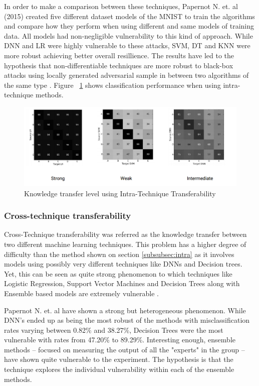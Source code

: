 In order to make a comparison between these techniques, Papernot N. et. al (2015) \cite{papernot2016transf} created five different dataset models of the MNIST to train the algorithms and compare how they perform when using different and same models of training data. All models had non-negligible vulnerability to this kind of approach. While DNN and LR were highly vulnerable to these attacks, SVM, DT and KNN were more robust achieving better overall resillience. The results have led to the hypothesis that non-differentiable techniques are more robust to black-box attacks using locally generated adversarial sample in between two algorithms of the same type \cite{papernot2016}. Figure ~\ref{fig:intra} shows classification performance when using intra-technique methods.

\begin{figure}[!h]
\centering
	\includegraphics[scale=0.6]{intra.png}
\caption{Knowledge transfer level using Intra-Technique Transferability \cite{papernot2016transf}}
\label{fig:intra}
\end{figure}


\subsubsection{Cross-technique transferability}
Cross-Technique transferability was referred as the knowledge transfer between two different machine learning techniques. This problem has a higher degree of difficulty than the method shown on section \ref{subsubsec:intra} as it involves models using possibly very different techniques like DNNs and Decision trees. Yet, this can be seen as quite strong phenomenon to which techniques like Logistic Regression, Support Vector Machines and Decision Trees along with Ensemble based models are extremely vulnerable \cite{papernot2016transf}.

Papernot N. et. al \cite{papernot2016transf} have shown a strong but heterogeneous phenomenon. While DNN's ended up as being the most robust of the methods with misclassification rates varying between 0.82\% and 38.27\%, Decision Trees were the most vulnerable with rates from 47.20\% to 89.29\%. Interesting enough, ensemble methods -- focused on measuring the output of all the "experts" in the group -- have shown quite vulnerable to the experiment. The hypothesis is that the technique explores the individual vulnerability within each of the ensemble methods.

